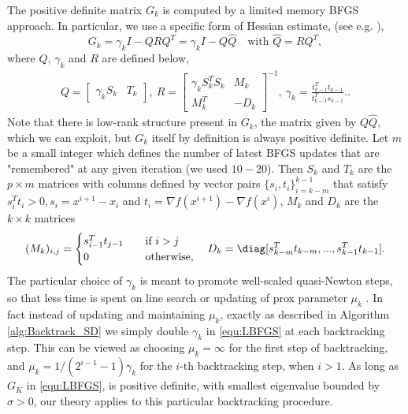 \documentclass[11pt]{article}
\numberwithin{equation}{section}
\begin{document}
The positive definite matrix $G_k$ is computed by a limited memory BFGS approach. In particular,
 we use a  specific form of Hessian estimate, (see e.g. \cite{Byrd1994,NoceWrig06}),
\begin{equation}
    \label{equ:LBFGS}
    G_k = \gamma_k I - QRQ^T = \gamma_k I - Q\hat Q \quad \mbox{with  } \hat Q= RQ^T,
\end{equation}
where $Q$, $\gamma_k$ and $R$ are defined below,
\begin{align}
    Q = 
    \begin{bmatrix}
        \gamma_kS_k &T_k
    \end{bmatrix}, ~
    R = 
    \begin{bmatrix}
        \gamma_kS_k^TS_k &M_k\\
        M_k^T   &-D_k
    \end{bmatrix}^{-1}, ~
    \gamma_k = \frac{t^T_{k-1}t_{k-1}}{t^T_{k-1}s_{k-1}}.   .
\end{align}
Note that there is low-rank structure present in $G_k$, the matrix given by $Q \hat Q$, which we can exploit, but $G_k$ itself by definition is always positive definite. 
Let $m$ be a small integer which defines the number of latest
BFGS updates that are "remembered" at any given iteration (we used $10-20$).
Then $S_k$ and $T_k$ are the $p \times m$ matrices with columns defined by  vector pairs $\{s_i,t_i\}_{i=k-m}^{k-1}$ that satisfy $s_i^Tt_i > 0, s_i = x^{i+1} - x_i$ and $t_i = \nabla f(x^{i+1}) - \nabla f(x^{i}) $, 
 $M_k$ and $D_k$ are the $k \times k$ matrices
    \begin{equation*}
        (M_k)_{i,j} = 
        \begin{cases}
            s_{i-1}^Tt_{j-1} \quad &\mbox{if }i > j \\
            0   \quad &\mbox{otherwise,}
        \end{cases} \quad D_k = \diag[s^T_{k-m}t_{k-m},...,s_{k-1}^Tt_{k-1}].
    \end{equation*}
 The particular choice of $\gamma_k$ is meant  to promote   well-scaled quasi-Newton steps, so that less time is spent on line search or updating of prox parameter $\mu_k$ \cite{NoceWrig06}. In fact instead of updating and maintaining $\mu_k$, exactly as described in Algorithm \ref{alg:Backtrack_SD}  we simply
 double $\gamma_k$ in \eqref{equ:LBFGS} at each backtracking step. This can be viewed as choosing   $\mu_k=\infty$ for the first step of backtracking, and $\mu_k=1/(2^{i-1}-1)\gamma_k$ for the $i$-th backtracking step, when $i>1$. As long as $G_K$ in \eqref{equ:LBFGS}, is positive definite, with smallest eigenvalue bounded by $\sigma>0$, our theory applies to this particular backtracking procedure. 
\end{document}
